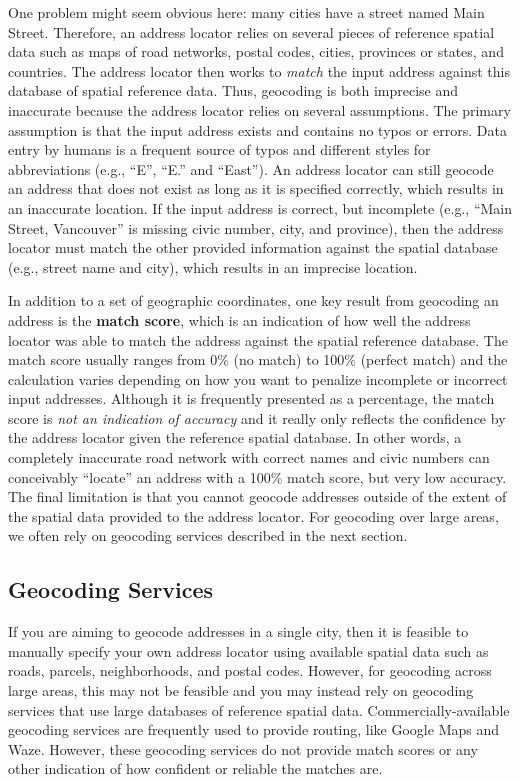 \documentclass[
]{book}
\begin{document}
One problem might seem obvious here: many cities have a street named Main Street. Therefore, an address locator relies on several pieces of reference spatial data such as maps of road networks, postal codes, cities, provinces or states, and countries. The address locator then works to \emph{match} the input address against this database of spatial reference data. Thus, geocoding is both imprecise and inaccurate because the address locator relies on several assumptions. The primary assumption is that the input address exists and contains no typos or errors. Data entry by humans is a frequent source of typos and different styles for abbreviations (e.g., ``E'', ``E.'' and ``East''). An address locator can still geocode an address that does not exist as long as it is specified correctly, which results in an inaccurate location. If the input address is correct, but incomplete (e.g., ``Main Street, Vancouver'' is missing civic number, city, and province), then the address locator must match the other provided information against the spatial database (e.g., street name and city), which results in an imprecise location.

In addition to a set of geographic coordinates, one key result from geocoding an address is the \textbf{match score}, which is an indication of how well the address locator was able to match the address against the spatial reference database. The match score usually ranges from 0\% (no match) to 100\% (perfect match) and the calculation varies depending on how you want to penalize incomplete or incorrect input addresses. Although it is frequently presented as a percentage, the match score is \emph{not an indication of accuracy} and it really only reflects the confidence by the address locator given the reference spatial database. In other words, a completely inaccurate road network with correct names and civic numbers can conceivably ``locate'' an address with a 100\% match score, but very low accuracy. The final limitation is that you cannot geocode addresses outside of the extent of the spatial data provided to the address locator. For geocoding over large areas, we often rely on geocoding services described in the next section.

\subsection{Geocoding Services}\label{geocoding-services}

If you are aiming to geocode addresses in a single city, then it is feasible to manually specify your own address locator using available spatial data such as roads, parcels, neighborhoods, and postal codes. However, for geocoding across large areas, this may not be feasible and you may instead rely on geocoding services that use large databases of reference spatial data. Commercially-available geocoding services are frequently used to provide routing, like Google Maps and Waze. However, these geocoding services do not provide match scores or any other indication of how confident or reliable the matches are.
\end{document}
